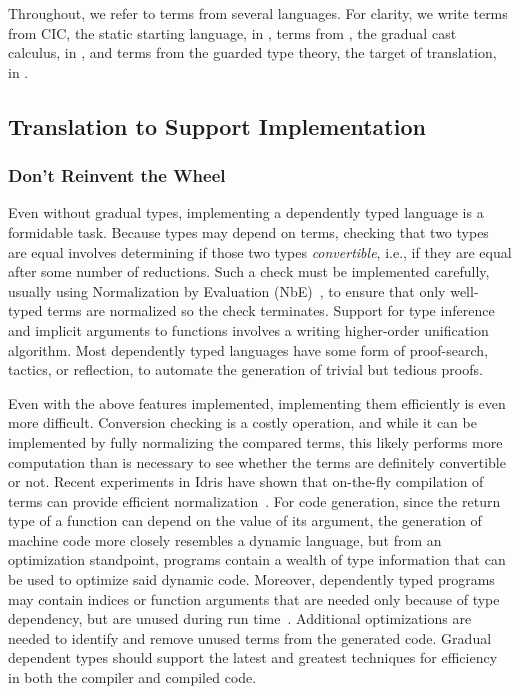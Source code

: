Throughout, we refer to terms from several languages. For clarity,
we write terms from CIC, the static starting language, in \staticdesc,
terms from \lang,  the gradual cast calculus, in \gradualdesc,
and terms from the guarded type theory, the target of translation,
in \targetdesc.



\subsection{Translation to Support Implementation}

\subsubsection{Don't Reinvent the Wheel}
Even without gradual types, implementing a dependently typed language is a formidable task.
Because types may depend on terms, checking that two types are equal involves
determining if those two types \textit{convertible}, i.e., if they are equal
after some number of reductions. Such a check must be implemented carefully,
usually using Normalization by Evaluation (NbE)~\citep{TODO}, to ensure that
only well-typed terms are normalized so the check terminates.
Support for type inference and implicit arguments to functions
involves a writing higher-order unification algorithm. Most dependently typed languages
have some form of proof-search, tactics, or reflection, to automate the generation of
trivial but tedious proofs.

Even with the above features implemented, implementing them
efficiently is even more difficult.
Conversion checking is a costly operation,
and while it can be implemented by fully normalizing the compared terms,
this likely performs more computation than is necessary to see whether the terms
are definitely convertible or not. Recent experiments in Idris have shown that
on-the-fly compilation of terms can provide efficient normalization~\citep{TODO}.
For code generation, since the return type of a function can depend on the value of its argument,
the generation of machine code more closely resembles a dynamic language, but from an optimization
standpoint, programs contain a wealth of type information that can be used to optimize said dynamic code.
Moreover, dependently typed programs may contain indices or function arguments
that are needed only because of type dependency, but are unused during run time~\citep{TODO}.
Additional optimizations are needed to identify and remove unused terms from the generated code.
Gradual dependent types should support the latest and greatest
techniques for efficiency in both the compiler and compiled code.


